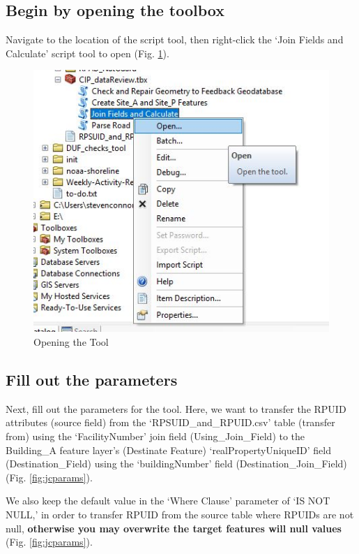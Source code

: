 \documentclass[openany]{book}
\theoremstyle{definition}
\theoremstyle{definition}
\theoremstyle{definition}
\theoremstyle{remark}
\begin{document}
\subsection{Begin by opening the
toolbox}\label{begin-by-opening-the-toolbox-1}

Navigate to the location of the script tool, then right-click the `Join
Fields and Calculate' script tool to open (Fig. \ref{fig:jcopen}).

\begin{figure}[H]

{\centering \includegraphics{figures/joinCalcopentool} 

}

\caption{Opening the Tool}\label{fig:jcopen}
\end{figure}

\subsection{Fill out the parameters}\label{fill-out-the-parameters-1}

Next, fill out the parameters for the tool. Here, we want to transfer
the RPUID attributes (source field) from the `RPSUID\_and\_RPUID.csv'
table (transfer from) using the `FacilityNumber' join field
(Using\_Join\_Field) to the Building\_A feature layer's (Destinate
Feature) `realPropertyUniqueID' field (Destination\_Field) using the
`buildingNumber' field (Destination\_Join\_Field) (Fig.
\ref{fig:jcparams}).

We also keep the default value in the `Where Clause' parameter of `IS
NOT NULL,' in order to transfer RPUID from the source table where RPUIDs
are not null, \textbf{otherwise you may overwrite the target features
will null values} (Fig. \ref{fig:jcparams}).
\end{document}

